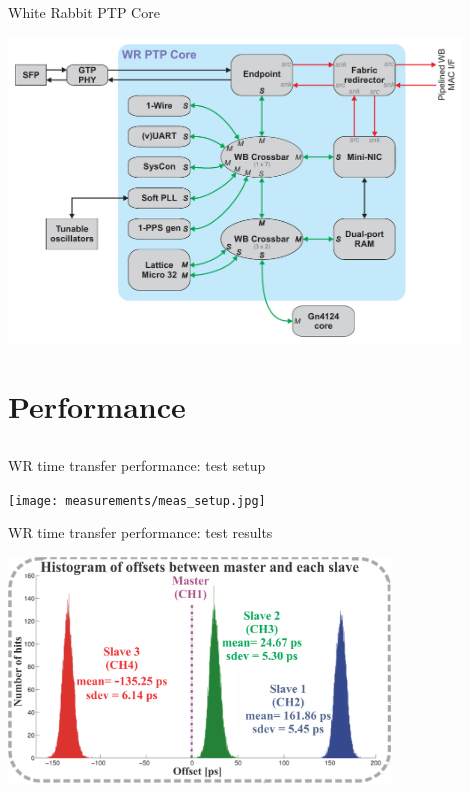 \documentclass[compress, red]{beamer}
\begin{document}
\begin{frame}{White Rabbit PTP Core}
 \begin{center}
   \includegraphics[width=0.9\textwidth]{node/wrpc_inside.pdf}
   \end{center}
\end{frame}


\section{Performance}
\subsection{}
\begin{frame}{WR time transfer performance: test setup}

    \begin{center}
    \texttt{[image: measurements/meas\_setup.jpg]}
    \end{center}

\end{frame}

\begin{frame}{WR time transfer performance: test results}

    \begin{center}
    \includegraphics[height=6.0cm]{measurements/meas_results.pdf}
    \end{center}

\end{frame}
\end{document}

